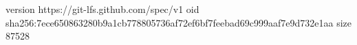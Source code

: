 version https://git-lfs.github.com/spec/v1
oid sha256:7ece650863280b9a1cb778805736af72ef6bf7feebad69c999aaf7e9d732e1aa
size 87528
